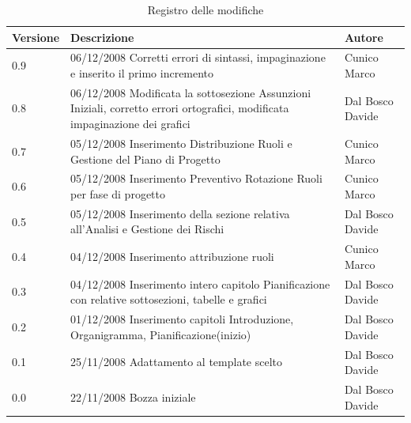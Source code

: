 \begin{center}
	\begin{table}[h]
		  \begin{tabular*}
			{1\textwidth}%
				{@{\extracolsep{\fill}}|p{}|p{}|p{}|}
			 \hline
			\textbf{Versione}  & \textbf{Descrizione} & \textbf{Autore} \\
		 \hline
          0.9 & 06/12/2008 Corretti errori di sintassi, impaginazione e inserito il primo incremento & Cunico Marco \\
          \hline
          0.8 & 06/12/2008 Modificata la sottosezione Assunzioni Iniziali, corretto errori ortografici, modificata impaginazione dei grafici & Dal Bosco Davide \\
		 \hline
          0.7 & 05/12/2008 Inserimento Distribuzione Ruoli e Gestione del Piano di Progetto & Cunico Marco \\
          \hline
          0.6 & 05/12/2008 Inserimento Preventivo Rotazione Ruoli per fase di progetto & Cunico Marco \\
          \hline
          0.5 & 05/12/2008 Inserimento della sezione relativa all'Analisi e Gestione dei Rischi & Dal Bosco Davide \\
          \hline         
          0.4 & 04/12/2008 Inserimento attribuzione ruoli & Cunico Marco \\
          \hline	          
          0.3 & 04/12/2008 Inserimento intero capitolo Pianificazione con relative sottosezioni, tabelle e grafici & Dal Bosco Davide \\
          \hline
    	  0.2 & 01/12/2008 Inserimento capitoli Introduzione, Organigramma, Pianificazione(inizio) & Dal Bosco Davide \\
    	  \hline
    	  0.1 & 25/11/2008 Adattamento al template scelto & Dal Bosco Davide \\
    	  \hline
    	  0.0 & 22/11/2008 Bozza iniziale & Dal Bosco Davide \\

		\hline %
		\end{tabular*}
	\caption{Registro delle modifiche} %
	\label{tab:modifiche}
	\end{table}
\end{center}


